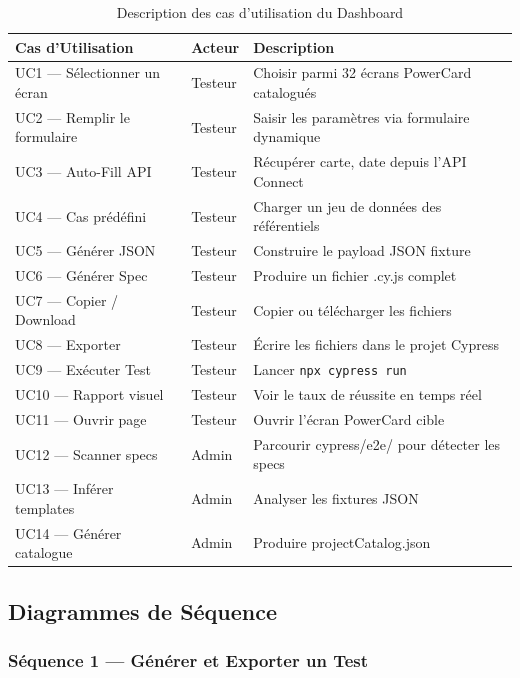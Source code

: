\begin{table}[H]
\centering\footnotesize
\caption{Description des cas d'utilisation du Dashboard}
\begin{tabularx}{\textwidth}{l l X}
\toprule
\textbf{Cas d'Utilisation} & \textbf{Acteur} & \textbf{Description} \\
\midrule
UC1 --- Sélectionner un écran & Testeur & Choisir parmi 32 écrans PowerCard catalogués \\
UC2 --- Remplir le formulaire & Testeur & Saisir les paramètres via formulaire dynamique \\
UC3 --- Auto-Fill API & Testeur & Récupérer carte, date depuis l'API Connect \\
UC4 --- Cas prédéfini & Testeur & Charger un jeu de données des référentiels \\
UC5 --- Générer JSON & Testeur & Construire le payload JSON fixture \\
UC6 --- Générer Spec & Testeur & Produire un fichier .cy.js complet \\
UC7 --- Copier / Download & Testeur & Copier ou télécharger les fichiers \\
UC8 --- Exporter & Testeur & Écrire les fichiers dans le projet Cypress \\
UC9 --- Exécuter Test & Testeur & Lancer \texttt{npx cypress run} \\
UC10 --- Rapport visuel & Testeur & Voir le taux de réussite en temps réel \\
UC11 --- Ouvrir page & Testeur & Ouvrir l'écran PowerCard cible \\
UC12 --- Scanner specs & Admin & Parcourir cypress/e2e/ pour détecter les specs \\
UC13 --- Inférer templates & Admin & Analyser les fixtures JSON \\
UC14 --- Générer catalogue & Admin & Produire projectCatalog.json \\
\bottomrule
\end{tabularx}
\end{table}

\newpage
\subsection{Diagrammes de Séquence}

\subsubsection{Séquence 1 --- Générer et Exporter un Test}

